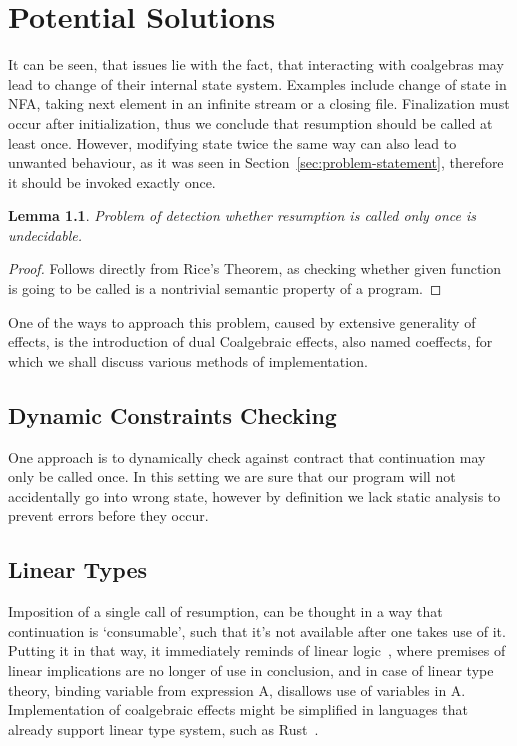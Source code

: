 \documentclass[declaration,shortabstract]{iithesis}
\theoremstyle{definition} \newtheorem{definition}{Definition}[chapter]
\theoremstyle{remark} \newtheorem{remark}[definition]{Observation}
\theoremstyle{plain} \newtheorem{theorem}[definition]{Theorem}
\theoremstyle{plain} \newtheorem{lemma}[definition]{Lemma}
\begin{document}
\chapter{Potential Solutions}\label{chapter:potential-solutions}

It can be seen, that issues lie with the fact, that interacting with coalgebras
may lead to change of their internal state system. Examples include change of
state in NFA, taking next element in an infinite stream or a closing file.
Finalization must occur after initialization, thus we conclude that resumption
should be called at least once. However, modifying state twice the same way can
also lead to unwanted behaviour, as it was seen in
Section~\ref{sec:problem-statement}, therefore it should be invoked exactly
once.

\begin{lemma}
    Problem of detection whether resumption is called only once is undecidable.
\end{lemma}
\begin{proof}
    Follows directly from Rice's Theorem, as checking whether given function is
    going to be called is a nontrivial semantic property of a program.
\end{proof}

One of the ways to approach this problem, caused by extensive generality of
effects, is the introduction of dual Coalgebraic effects, also named coeffects,
for which we shall discuss various methods of implementation.

\section{Dynamic Constraints Checking}

One approach is to dynamically check against contract that continuation may only
be called once. In this setting we are sure that our program will not accidentally
go into wrong state, however by definition we lack static analysis to prevent
errors before they occur.

\section{Linear Types}

Imposition of a single call of resumption, can be thought in a way that continuation
is `consumable', such that it's not available after one takes use of it. Putting
it in that way, it immediately reminds of linear logic~\cite{linear-logic},
where premises of linear implications are no longer of use in conclusion, and
in case of linear type theory, binding variable from expression A, disallows
use of variables in A. Implementation of coalgebraic effects might be simplified
in languages that already support linear type system, such as Rust~\cite{rust}.
\end{document}
